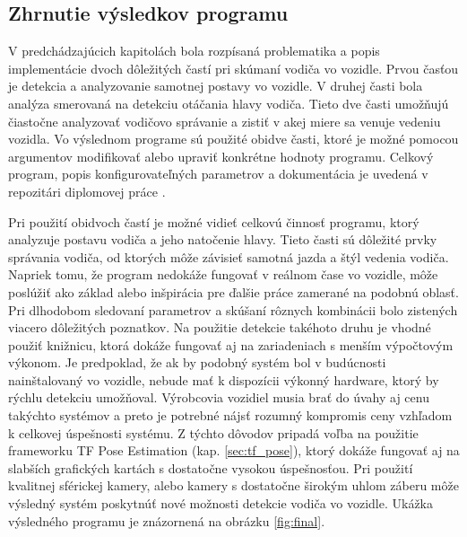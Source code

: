 \documentclass[slovak,master,dept460,male,cpp,cpdeclaration]{diploma}
\begin{document}
\subsection{Zhrnutie výsledkov programu}
V predchádzajúcich kapitolách bola rozpísaná problematika a popis implementácie dvoch dôležitých častí pri skúmaní vodiča vo vozidle. Prvou časťou je detekcia a analyzovanie samotnej postavy vo vozidle. V druhej časti bola analýza smerovaná na detekciu otáčania hlavy vodiča. Tieto dve časti umožňujú čiastočne  analyzovať  vodičovo správanie a zistiť v akej miere sa venuje vedeniu vozidla. Vo výslednom programe sú použité obidve časti, ktoré je možné pomocou argumentov modifikovať alebo upraviť konkrétne hodnoty programu. Celkový program, popis konfigurovateľných parametrov a dokumentácia je uvedená v repozitári diplomovej práce \cite{diplomaRepo}.\par
Pri použití obidvoch častí je možné vidieť celkovú činnosť programu, ktorý analyzuje postavu  vodiča a jeho natočenie hlavy. Tieto časti sú dôležité prvky správania vodiča, od ktorých môže závisieť samotná jazda a štýl vedenia vodiča. Napriek tomu, že program nedokáže fungovať v reálnom čase vo vozidle, môže poslúžiť ako základ alebo inšpirácia pre ďalšie práce zamerané na podobnú oblasť.  Pri dlhodobom sledovaní parametrov a skúšaní rôznych kombinácii bolo zistených viacero dôležitých poznatkov. Na použitie detekcie takéhoto druhu je vhodné použiť knižnicu, ktorá dokáže fungovať aj na zariadeniach s menším výpočtovým výkonom. Je predpoklad, že ak by podobný systém bol v budúcnosti nainštalovaný vo vozidle, nebude mať k dispozícii výkonný hardware, ktorý by rýchlu detekciu umožňoval. Výrobcovia vozidiel musia brať do úvahy aj cenu takýchto systémov a preto je potrebné nájsť rozumný kompromis ceny vzhľadom k celkovej úspešnosti systému.  Z týchto dôvodov pripadá voľba na použitie frameworku TF Pose Estimation (kap. \ref{sec:tf_pose}), ktorý dokáže fungovať aj na slabších grafických kartách s dostatočne vysokou úspešnosťou. Pri použití kvalitnej sférickej kamery, alebo kamery s dostatočne širokým uhlom záberu môže výsledný systém poskytnúť nové možnosti detekcie vodiča vo vozidle. Ukážka výsledného programu je znázornená na obrázku \ref{fig:final}.
\end{document}

